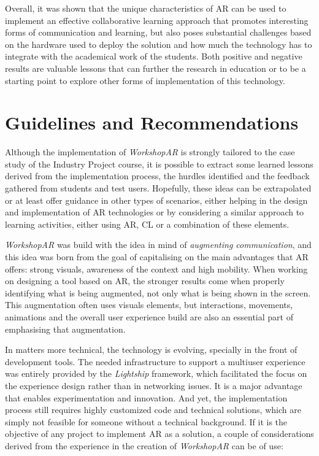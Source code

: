Overall, it was shown that the unique characteristics of \ac{AR} can be used to implement an effective collaborative learning approach that promotes interesting forms of communication and
learning, but also poses substantial challenges based on the hardware used to deploy the solution and how much the technology has to integrate with the academical work of the students. Both
positive and negative results are valuable lessons that can further the research in education or to be a starting point to explore other forms of implementation of this technology.

\section{Guidelines and Recommendations \label{sec:7-2}}

Although the implementation of \emph{WorkshopAR} is strongly tailored to the case study of the Industry Project course, it is possible to extract some learned lessons derived from the
implementation process, the hurdles identified and the feedback gathered from students and test users. Hopefully, these ideas can be extrapolated or at least offer guidance in other types
of scenarios, either helping in the design and implementation of \ac{AR} technologies or by considering a similar approach to learning activities, either using \ac{AR}, CL or a combination of these
elements.

\emph{WorkshopAR} was build with the idea in mind of \emph{augmenting communication}, and this idea was born from the goal of capitalising on the main advantages that \ac{AR} offers: strong visuals,
awareness of the context and high mobility. When working on designing a tool based on \ac{AR}, the stronger results come when properly identifying what is being augmented, not only what is
being shown in the screen. This augmentation often uses visuals elements, but interactions, movements, animations and the overall user experience build are also an essential part of emphasising
that augmentation.

In matters more technical, the technology is evolving, specially in the front of development tools. The needed infrastructure to support a multiuser experience was entirely provided by the \emph{Lightship}
framework, which facilitated the focus on the experience design rather than in networking issues. It is a major advantage that enables experimentation and innovation. And yet, the implementation
process still requires highly customized code and technical solutions, which are simply not feasible for someone without a technical background. If it is the objective of any project to implement
\ac{AR} as a solution, a couple of considerations derived from the experience in the creation of \emph{WorkshopAR} can be of use:

